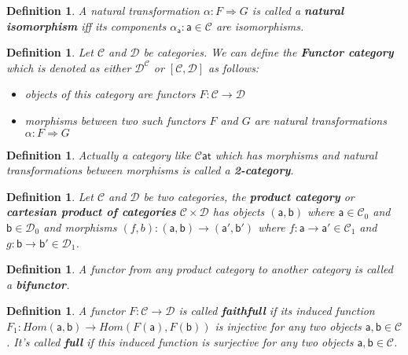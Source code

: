 \documentclass{article}
\newcommand{\cat}[1]{\mathcal{#1}} %
\newcommand{\cato}[1]{\cat{#1}_0} %
\newcommand{\catm}[1]{\cat{#1}_1} %
\newcommand{\ob}[1]{\mathsf{#1}} %
\newcommand{\scat}{\cat{C}\ob{at}}
\newtheorem{definition}[theorem]{Definition}
\begin{document}
\begin{definition}
	A natural transformation $\alpha: F \Rightarrow G$ is called a \textbf{natural isomorphism} iff its components $\alpha_{\ob{a}}: \ob{a} \in \cat{C}$ are isomorphisms.
\end{definition}

\begin{definition}
	Let $\cat{C}$ and $\cat{D}$ be categories. We can define the \textbf{Functor category} which is denoted as either $\cat{D}^{\cat{C}}$ or $[\cat{C}, \cat{D}]$ as follows:
	\begin{itemize}
		\item objects of this category are functors $F: \cat{C} \rightarrow \cat{D}$
		\item morphisms between two such functors $F$ and $G$ are natural transformations $\alpha: F \Rightarrow G$
	\end{itemize}
\end{definition}

\begin{definition}
	Actually a category like $\scat$ which has morphisms and natural transformations between morphisms is called a \textbf{2-category}.
\end{definition}

\begin{definition}
	Let $\cat{C}$ and $\cat{D}$ be two categories, the \textbf{product category} or \textbf{cartesian product of categories} $\cat{C} \times \cat{D}$ has objects $(\ob{a}, \ob{b})$
	where $\ob{a} \in \cato{C}$ and $\ob{b} \in \cato{D}$ and morphisms $(f,b): (\ob{a}, \ob{b}) \rightarrow (\ob{a'}, \ob{b'})$ where $f: \ob{a} \rightarrow \ob{a'} \in \catm{C}$ and $g: \ob{b} \rightarrow \ob{b'} \in \catm{D}$.
\end{definition}

\begin{definition}
	A functor from any product category to another category is called a \textbf{bifunctor}.
\end{definition}

\begin{definition}
	A functor $F: \cat{C} \rightarrow \cat{D}$ is called \textbf{faithfull} if its induced function $F_1: Hom(\ob{a}, \ob{b}) \rightarrow Hom(F(\ob{a}), F(\ob{b}))$ is injective for any two objects $\ob{a}, \ob{b} \in \cat{C}$.
	It's called \textbf{full} if this induced function is surjective for any two objects $\ob{a}, \ob{b} \in \cat{C}$.
\end{definition}
\end{document}
